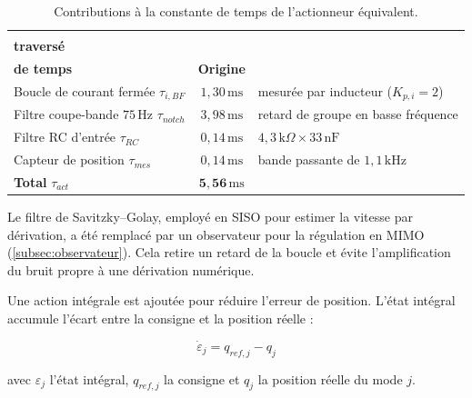 \begin{table}[H]
    \centering
    \begin{tabular}{lcl}
        \toprule
        \makecell[l]{\textbf{Élément}                                                                                                           \\ \textbf{traversé}} & \makecell[c]{\textbf{Constante} \\ \textbf{de temps}} & \textbf{Origine} \\
        \midrule
        Boucle de courant fermée $\tau_{i,BF}$              & $1{,}30\,\mathrm{ms}$          & mesurée par inducteur ($K_{p,i} = 2$)            \\
        Filtre coupe-bande $75\,\mathrm{Hz}$ $\tau_{notch}$ & $3{,}98\,\mathrm{ms}$          & retard de groupe en basse fréquence              \\
        Filtre RC d'entrée $\tau_{RC}$                      & $0{,}14\,\mathrm{ms}$          & $4{,}3\,\mathrm{k}\Omega \times 33\,\mathrm{nF}$ \\
        Capteur de position $\tau_{mes}$                    & $0{,}14\,\mathrm{ms}$          & bande passante de $1{,}1\,\mathrm{kHz}$          \\
        \midrule
        \textbf{Total} $\tau_{act}$                         & $\mathbf{5{,}56\,\mathrm{ms}}$ &                                                  \\
        \bottomrule
    \end{tabular}
    \caption{Contributions à la constante de temps de l'actionneur équivalent.}
    \label{tab:tau-act}
\end{table}

Le filtre de Savitzky--Golay, employé en SISO pour estimer la vitesse par dérivation, a été remplacé par un observateur pour la régulation en MIMO (\autoref{subsec:observateur}). Cela retire un retard de la boucle et évite l'amplification du bruit propre à une dérivation numérique.

Une action intégrale est ajoutée pour réduire l'erreur de position. L'état intégral accumule l'écart entre la consigne et la position réelle :

\begin{equation}
    \dot\varepsilon_j = q_{ref,j} - q_j
    \label{eq:integrateur}
\end{equation}

avec $\varepsilon_j$ l'état intégral, $q_{ref,j}$ la consigne et $q_j$ la position réelle du mode $j$.

